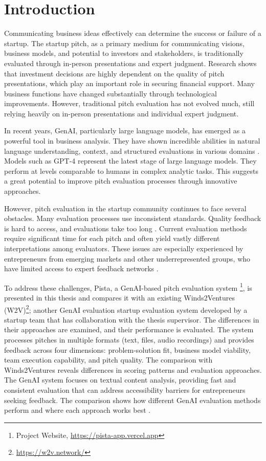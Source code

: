 \chapter{Introduction}

\label{ch:introduction}

Communicating business ideas effectively can determine the success or failure of a startup. The startup pitch, as a primary medium for communicating visions, business models, and potential to investors and stakeholders, is traditionally evaluated through in-person presentations and expert judgment.  Research shows that investment decisions are highly dependent on the quality of pitch presentations, which play an important role in securing financial support\cite{masterpresentat}. Many business functions have changed substantially through technological improvements. However, traditional pitch evaluation has not evolved much, still relying heavily on in-person presentations and individual expert judgment.

In recent years, GenAI, particularly large language models, has emerged as a powerful tool in business analysis. They have shown incredible abilities in natural language understanding, context, and structured evaluations in various domains \cite{Ozince2024}. Models such as GPT-4 represent the latest stage of large language models. They perform at levels comparable to humans in complex analytic tasks. This suggests a great potential to improve pitch evaluation processes through innovative approaches\cite{gpt}.

However, pitch evaluation in the startup community continues to face several obstacles. Many evaluation processes use inconsistent standards. Quality feedback is hard to access, and evaluations take too long \cite{StartupEvaluati, Kalvapalle2024}. Current evaluation methods require significant time for each pitch and often yield vastly different interpretations among evaluators. These issues are especially experienced by entrepreneurs from emerging markets and other underrepresented groups, who have limited access to expert feedback networks \cite{BreakingBarrier}.

To address these challenges, Pista, a GenAI-based pitch evaluation system \footnote{Project Website, \url{https://pista-app.vercel.app}}, is presented in this thesis and compares it with an existing Winds2Ventures (W2V)\footnote{\url{https://w2v.network/}}; another GenAI evaluation startup evaluation system developed by a startup team that has collaboration with the thesis supervisor.
The differences in their approaches are examined, and their performance is evaluated. The system processes pitches in multiple formats (text, files, audio recordings) and provides feedback across four dimensions: problem-solution fit, business model viability, team execution capability, and pitch quality. The comparison with Winds2Ventures reveals differences in scoring patterns and evaluation approaches.
The GenAI system focuses on textual content analysis, providing fast and consistent evaluation that can address accessibility barriers for entrepreneurs seeking feedback.  The comparison shows how different GenAI evaluation methods perform and where each approach works best \cite{TheFutureofAIEv}.

